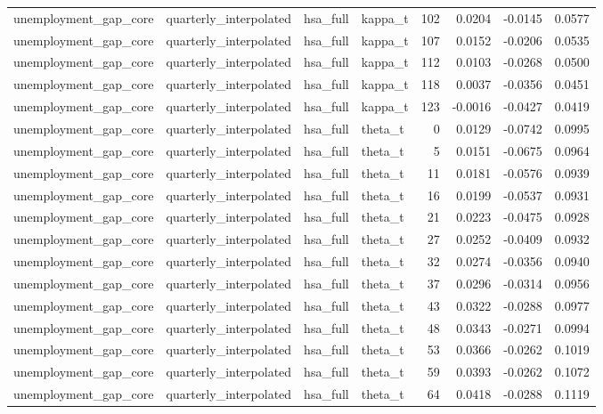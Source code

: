 \begin{tabular}{llllrrrr}
unemployment\_gap\_core & quarterly\_interpolated & hsa\_full & kappa\_t & 102 & 0.0204 & -0.0145 & 0.0577 \\
unemployment\_gap\_core & quarterly\_interpolated & hsa\_full & kappa\_t & 107 & 0.0152 & -0.0206 & 0.0535 \\
unemployment\_gap\_core & quarterly\_interpolated & hsa\_full & kappa\_t & 112 & 0.0103 & -0.0268 & 0.0500 \\
unemployment\_gap\_core & quarterly\_interpolated & hsa\_full & kappa\_t & 118 & 0.0037 & -0.0356 & 0.0451 \\
unemployment\_gap\_core & quarterly\_interpolated & hsa\_full & kappa\_t & 123 & -0.0016 & -0.0427 & 0.0419 \\
unemployment\_gap\_core & quarterly\_interpolated & hsa\_full & theta\_t & 0 & 0.0129 & -0.0742 & 0.0995 \\
unemployment\_gap\_core & quarterly\_interpolated & hsa\_full & theta\_t & 5 & 0.0151 & -0.0675 & 0.0964 \\
unemployment\_gap\_core & quarterly\_interpolated & hsa\_full & theta\_t & 11 & 0.0181 & -0.0576 & 0.0939 \\
unemployment\_gap\_core & quarterly\_interpolated & hsa\_full & theta\_t & 16 & 0.0199 & -0.0537 & 0.0931 \\
unemployment\_gap\_core & quarterly\_interpolated & hsa\_full & theta\_t & 21 & 0.0223 & -0.0475 & 0.0928 \\
unemployment\_gap\_core & quarterly\_interpolated & hsa\_full & theta\_t & 27 & 0.0252 & -0.0409 & 0.0932 \\
unemployment\_gap\_core & quarterly\_interpolated & hsa\_full & theta\_t & 32 & 0.0274 & -0.0356 & 0.0940 \\
unemployment\_gap\_core & quarterly\_interpolated & hsa\_full & theta\_t & 37 & 0.0296 & -0.0314 & 0.0956 \\
unemployment\_gap\_core & quarterly\_interpolated & hsa\_full & theta\_t & 43 & 0.0322 & -0.0288 & 0.0977 \\
unemployment\_gap\_core & quarterly\_interpolated & hsa\_full & theta\_t & 48 & 0.0343 & -0.0271 & 0.0994 \\
unemployment\_gap\_core & quarterly\_interpolated & hsa\_full & theta\_t & 53 & 0.0366 & -0.0262 & 0.1019 \\
unemployment\_gap\_core & quarterly\_interpolated & hsa\_full & theta\_t & 59 & 0.0393 & -0.0262 & 0.1072 \\
unemployment\_gap\_core & quarterly\_interpolated & hsa\_full & theta\_t & 64 & 0.0418 & -0.0288 & 0.1119 \\

\end{tabular}
